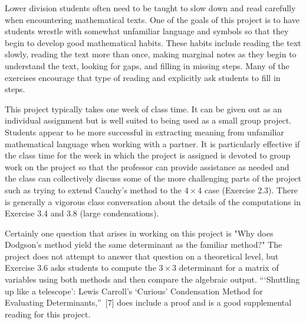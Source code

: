 \documentclass[11pt]{article}%
\theoremstyle{definition}
\begin{document}
Lower division students often need to be taught to slow down and read
carefully when encountering mathematical texts. One of the goals of this
project is to have students wrestle with somewhat unfamiliar language and
symbols so that they begin to develop good mathematical habits. These habits
include reading the text slowly, reading the text more than once, making
marginal notes as they begin to understand the text, looking for gaps, and
filling in missing steps. Many of the exercises encourage that type of reading
and explicitly ask students to fill in steps.

This project typically takes one week of class time. It can be given out as an
individual assignment but is well suited to being used as a small group
project. Students appear to be more successful in extracting meaning from
unfamiliar mathematical language when working with a partner. It is
particularly effective if the class time for the week in which the project is
assigned is devoted to group work on the project so that the professor can
provide assistance as needed and the class can collectively discuss some of
the more challenging parts of the project such as trying to extend Cauchy's
method to the $4\times4$ case (Exercise 2.3). There is generally a vigorous
class conversation about the details of the computations in Exercise 3.4 and
3.8 (large condensations).

Certainly one question that arises in working on this project is "Why does
Dodgson's method yield the same determinant as the familiar method?" The
project does not attempt to answer that question on a theoretical level, but
Exercise 3.6 asks students to compute the $3\times3$ determinant for a matrix
of variables using both methods and then compare the algebraic output.
\textquotedblleft`Shuttling up like a telescope': Lewis Carroll's `Curious'
Condensation Method for Evaluating Determinants,\textquotedblright\ [7] does
include a proof and is a good supplemental reading for this project.
\end{document}
